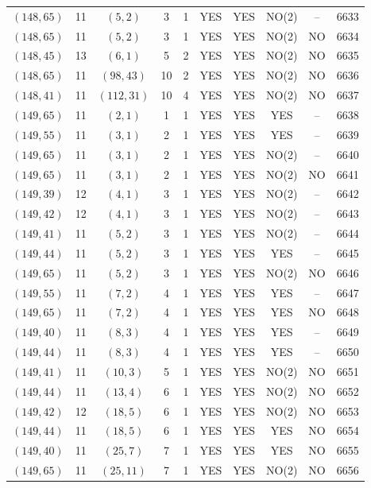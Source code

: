 \begin{longtable}{|c|c|c|c|c|c|c|c|c|c|}
$(148, 65)$ & 11 & $(5, 2)$ & 3 & 1 & YES & YES & NO(2) & -- & 6633\\
$(148, 65)$ & 11 & $(5, 2)$ & 3 & 1 & YES & YES & NO(2) & NO & 6634\\
$(148, 45)$ & 13 & $(6, 1)$ & 5 & 2 & YES & YES & NO(2) & NO & 6635\\
$(148, 65)$ & 11 & $(98, 43)$ & 10 & 2 & YES & YES & NO(2) & NO & 6636\\
$(148, 41)$ & 11 & $(112, 31)$ & 10 & 4 & YES & YES & NO(2) & NO & 6637\\
$(149, 65)$ & 11 & $(2, 1)$ & 1 & 1 & YES & YES & YES & -- & 6638\\
$(149, 55)$ & 11 & $(3, 1)$ & 2 & 1 & YES & YES & YES & -- & 6639\\
$(149, 65)$ & 11 & $(3, 1)$ & 2 & 1 & YES & YES & NO(2) & -- & 6640\\
$(149, 65)$ & 11 & $(3, 1)$ & 2 & 1 & YES & YES & NO(2) & NO & 6641\\
$(149, 39)$ & 12 & $(4, 1)$ & 3 & 1 & YES & YES & NO(2) & -- & 6642\\
$(149, 42)$ & 12 & $(4, 1)$ & 3 & 1 & YES & YES & NO(2) & -- & 6643\\
$(149, 41)$ & 11 & $(5, 2)$ & 3 & 1 & YES & YES & NO(2) & -- & 6644\\
$(149, 44)$ & 11 & $(5, 2)$ & 3 & 1 & YES & YES & YES & -- & 6645\\
$(149, 65)$ & 11 & $(5, 2)$ & 3 & 1 & YES & YES & NO(2) & NO & 6646\\
$(149, 55)$ & 11 & $(7, 2)$ & 4 & 1 & YES & YES & YES & -- & 6647\\
$(149, 65)$ & 11 & $(7, 2)$ & 4 & 1 & YES & YES & YES & NO & 6648\\
$(149, 40)$ & 11 & $(8, 3)$ & 4 & 1 & YES & YES & YES & -- & 6649\\
$(149, 44)$ & 11 & $(8, 3)$ & 4 & 1 & YES & YES & YES & -- & 6650\\
$(149, 41)$ & 11 & $(10, 3)$ & 5 & 1 & YES & YES & NO(2) & NO & 6651\\
$(149, 44)$ & 11 & $(13, 4)$ & 6 & 1 & YES & YES & NO(2) & NO & 6652\\
$(149, 42)$ & 12 & $(18, 5)$ & 6 & 1 & YES & YES & NO(2) & NO & 6653\\
$(149, 44)$ & 11 & $(18, 5)$ & 6 & 1 & YES & YES & YES & NO & 6654\\
$(149, 40)$ & 11 & $(25, 7)$ & 7 & 1 & YES & YES & YES & NO & 6655\\
$(149, 65)$ & 11 & $(25, 11)$ & 7 & 1 & YES & YES & NO(2) & NO & 6656\\

\end{longtable}
